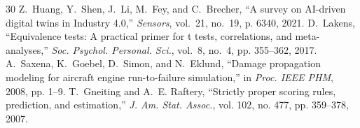 \documentclass[conference,a4paper]{IEEEtran}
\begin{document}
\begin{thebibliography}{30}
Z.~Huang, Y.~Shen, J.~Li, M.~Fey, and C.~Brecher, ``A survey on AI-driven digital twins in Industry 4.0,'' \emph{Sensors}, vol.~21, no.~19, p. 6340, 2021.
D.~Lakens, ``Equivalence tests: A practical primer for t tests, correlations, and meta-analyses,'' \emph{Soc. Psychol. Personal. Sci.}, vol.~8, no.~4, pp. 355--362, 2017.
A.~Saxena, K.~Goebel, D.~Simon, and N.~Eklund, ``Damage propagation modeling for aircraft engine run-to-failure simulation,'' in \emph{Proc. IEEE PHM}, 2008, pp. 1--9.
T.~Gneiting and A.~E. Raftery, ``Strictly proper scoring rules, prediction, and estimation,'' \emph{J. Am. Stat. Assoc.}, vol. 102, no. 477, pp. 359--378, 2007.

\end{thebibliography}
\end{document}
